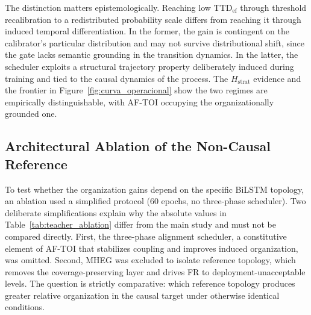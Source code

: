 \documentclass[a4paper,fleqn]{cas-dc}
\newcommand{\AFTOI}{\mbox{AF-TOI}\xspace}
\newcommand{\MHEG}{\mbox{MHEG}\xspace}
\begin{document}
The distinction matters epistemologically. Reaching low
$\mathrm{TTD}_{\mathrm{ef}}$ through threshold recalibration to a redistributed
probability scale differs from reaching it through induced temporal
differentiation. In the former, the gain is contingent on the calibrator's
particular distribution and may not survive distributional shift, since the gate
lacks semantic grounding in the transition dynamics. In the latter, the
scheduler exploits a structural trajectory property deliberately induced during
training and tied to the causal dynamics of the process. The
$H_{\mathrm{strat}}$ evidence and the frontier in
Figure~\ref{fig:curva_operacional} show the two regimes are empirically
distinguishable, with \AFTOI occupying the organizationally grounded one.
\subsection{Architectural Ablation of the Non-Causal Reference}
\label{sec:ablacao_teacher}
To test whether the organization gains depend on the specific BiLSTM topology,
an ablation used a simplified protocol (60 epochs, no three-phase scheduler).
Two deliberate simplifications explain why the absolute values in
Table~\ref{tab:teacher_ablation} differ from the main study and must not be
compared directly. First, the three-phase alignment scheduler, a constitutive
element of \AFTOI that stabilizes coupling and improves induced organization,
was omitted. Second, \MHEG was excluded to isolate reference topology, which
removes the coverage-preserving layer and drives FR to deployment-unacceptable
levels. The question is strictly comparative: which reference topology produces
greater relative organization in the causal target under otherwise identical
conditions.
\end{document}
